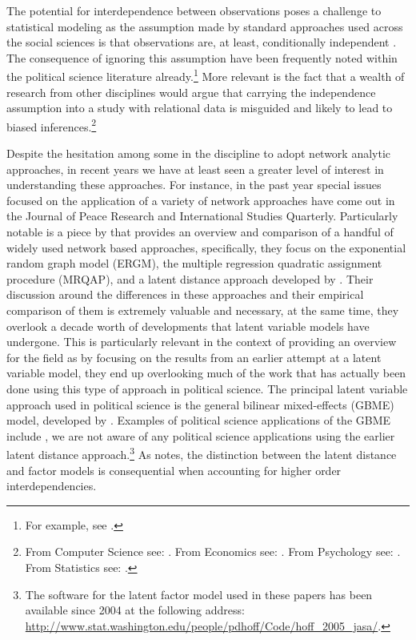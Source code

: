 The potential for interdependence between observations poses a challenge to statistical modeling as the assumption made by standard approaches used across the social sciences is that observations are, at least, conditionally independent \citep{snijders:2011}. The consequence of ignoring this assumption have been frequently noted within the political science literature already.\footnote{For example, see \citet{beck:etal:1998,signorino:1999,hoff:ward:2004,franzese:hayes:2007,cranmer:desmarais:2011,erikson:pinto:2014}.} More relevant is the fact that a wealth of research from other disciplines would argue that carrying the independence assumption into a study with relational data is misguided and likely to lead to biased inferences.\footnote{From Computer Science see: \citet{bonabeau:2002,brandes:erlebach:2005}. From Economics see: \citet{goyal:2012,jackson:2014}. From Psychology see: \citet{pattison:wasserman:1999,kenny:etal:2006}. From Statistics see: \citet{snijders:1996,hoff:etal:2002}.} 

Despite the hesitation among some in the discipline to adopt network analytic approaches, in recent years we have at least seen a greater level of interest in understanding these approaches. For instance, in the past year special issues focused on the application of a variety of network approaches have come out in the Journal of Peace Research and International Studies Quarterly. Particularly notable is a piece by \citet{cranmer:etal:2016} that provides an overview and comparison of a handful of widely used network based approaches, specifically, they focus on the exponential random graph model (ERGM), the multiple regression quadratic assignment procedure (MRQAP), and a latent distance approach developed by \citet{hoff:etal:2002}. Their discussion around the differences in these approaches and their empirical comparison of them is extremely valuable and necessary, at the same time, they overlook a decade worth of developments that latent variable models have undergone. This is particularly relevant in the context of providing an overview for the field as by focusing on the results from an earlier attempt at a latent variable model, they end up overlooking much of the work that has actually been done using this type of approach in political science. The principal latent variable approach used in political science is the general bilinear mixed-effects (GBME) model, developed by \citet{hoff:2005}. Examples of political science applications of the GBME include \citet{hoff:ward:2004,ward:etal:2007,metternich:etal:2015}, we are not aware of any political science applications using the earlier latent distance approach.\footnote{The software for the latent factor model used in these papers has been available since 2004 at the following address: \url{http://www.stat.washington.edu/people/pdhoff/Code/hoff_2005_jasa/}.} As \citet{hoff:2008} notes, the distinction between the latent distance and factor models is consequential when accounting for higher order interdependencies.

